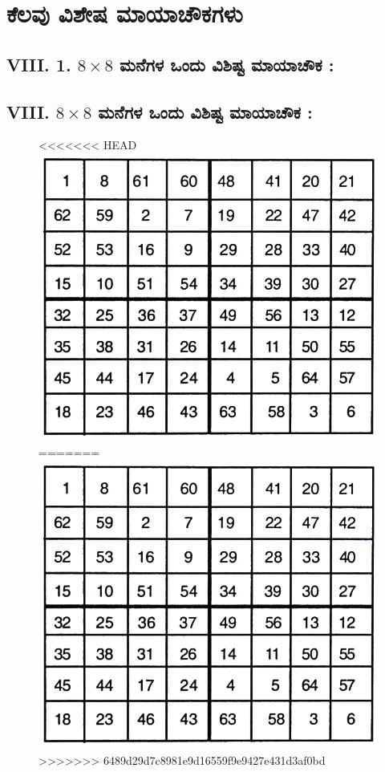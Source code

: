 \chapter{ಕೆಲವು ವಿಶೇಷ ಮಾಯಾಚೌಕಗಳು}

\section*{VIII. 1. $8 \times 8$ ಮನೆಗಳ ಒಂದು ವಿಶಿಷ್ಟ ಮಾಯಾಚೌಕ :}

\section*{VIII. $8 \times 8$ ಮನೆಗಳ ಒಂದು ವಿಶಿಷ್ಟ ಮಾಯಾಚೌಕ :}
\begin{figure}[H]
<<<<<<< HEAD
\includegraphics{src/figures/chap7/fig7-1.jpg}
=======
\includegraphics[scale=0.8]{src/figures/chap7/fig7.1.jpg}
>>>>>>> 6489d29d7c8981e9d16559f9e9427e431d3af0bd
\end{figure}

